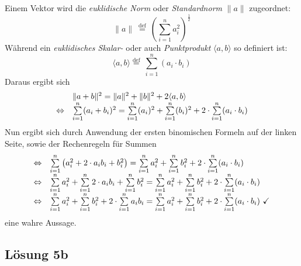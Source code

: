 Einem Vektor wird die \textit{euklidische Norm} oder \textit{Standardnorm} $\displaystyle \| a\| $ zugeordnet: 
\begin{equation*}
  \| a\| \ \stackrel{\text{def}}{=} \ \left(\sum _{i=1}^{n} a_{i}^{2}\right)^{\frac{1}{2}}
\end{equation*}
Während ein \textit{euklidisches Skalar-} oder auch \textit{Punktprodukt} $\displaystyle \langle a,b\rangle $ so definiert ist:
\begin{equation*}
  \langle a,b\rangle \stackrel{\text{def}}{=} \ \sum _{i=1}^{n}( a_{i} \cdot b_{i})
\end{equation*}
Daraus ergibt sich
\begin{equation*}
  \begin{array}{ c l }
    & \| a+b\| ^{2} =\| a\| ^{2} +\| b\| ^{2} +2\langle a,b\rangle \\
    \Leftrightarrow  & \sum\limits _{i=1}^{n}( a_{i} +b_{i})^{2} =\sum\limits _{i=1}^{n}( a_{i})^{2} +\sum\limits _{i=1}^{n}( b_{i})^{2} +2\cdot \sum\limits _{i=1}^{n}( a_{i} \cdot b_{i})
  \end{array}
\end{equation*}
Nun ergibt sich durch Anwendung der ersten binomischen Formeln auf der linken Seite, sowie der Rechenregeln für Summen
\begin{equation*}
  \begin{array}{ c l }
    \Leftrightarrow  & \sum\limits _{i=1}^{n}\left( a_{i}^{2} +2\cdot a_{i} b_{i} +b_{i}^{2}\right) =\sum\limits _{i=1}^{n} a_{i}^{2} +\sum\limits _{i=1}^{n} b_{i}^{2} +2\cdot \sum\limits _{i=1}^{n}( a_{i} \cdot b_{i})\\
    \Leftrightarrow  & \sum\limits _{i=1}^{n} a_{i}^{2} +\sum\limits _{i=1}^{n} 2\cdot a_{i} b_{i} +\sum\limits _{i=1}^{n} b_{i}^{2} =\sum\limits _{i=1}^{n} a_{i}^{2} +\sum\limits _{i=1}^{n} b_{i}^{2} +2\cdot \sum\limits _{i=1}^{n}( a_{i} \cdot b_{i})\\
    \Leftrightarrow  & \sum\limits _{i=1}^{n} a_{i}^{2} +\sum\limits _{i=1}^{n} b_{i}^{2} +2\cdot \sum\limits _{i=1}^{n} a_{i} b_{i} =\sum\limits _{i=1}^{n} a_{i}^{2} +\sum\limits _{i=1}^{n} b_{i}^{2} +2\cdot \sum\limits _{i=1}^{n}( a_{i} \cdot b_{i}) \ \checkmark 
  \end{array}
\end{equation*}
eine wahre Aussage. 


\subsection{Lösung 5b}

